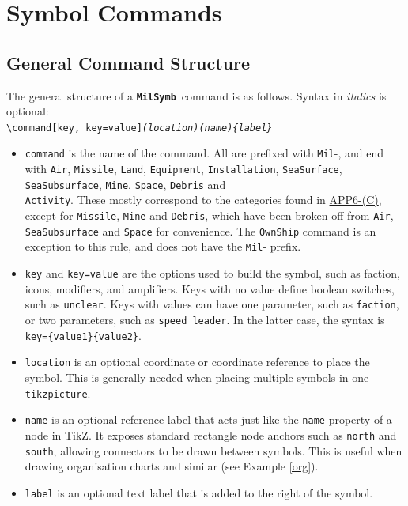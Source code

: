 \documentclass[a4paper, titlepage]{article}
\newcommand\MilSymb{\textbf{\texttt{MilSymb}}}
\newcommand\DocLink{\href{https://www.awl.edu.pl/images/en/APP_6_C.pdf}{APP6-(C)}}
\begin{document}
\section{Symbol Commands}

\subsection{General Command Structure}

The general structure of a \MilSymb\  command is as follows. Syntax in \textit{italics} is optional:\\

\texttt{\textbackslash command[key, key=value]\textit{(location)(name)\{label\}}}

\begin{itemize}
\item \texttt{command} is the name of the command. All are prefixed with \texttt{Mil}-, and end with \texttt{Air}, \texttt{Missile}, \texttt{Land}, \texttt{Equipment}, \texttt{Installation}, \texttt{SeaSurface}, \texttt{SeaSubsurface}, \texttt{Mine}, \texttt{Space}, \texttt{Debris} and\\ \texttt{Activity}. These mostly correspond to the categories found in \DocLink, except for \texttt{Missile}, \texttt{Mine} and \texttt{Debris}, which have been broken off from \texttt{Air}, \texttt{SeaSubsurface} and \texttt{Space} for convenience. The \texttt{OwnShip} command is an exception to this rule, and does not have the \texttt{Mil}- prefix.

\item \texttt{key} and \texttt{key=value} are the options used to build the symbol, such as faction, icons, modifiers, and amplifiers. Keys with no value define boolean switches, such as \texttt{unclear}. Keys with values can have one parameter, such as \texttt{faction}, or two parameters, such as \texttt{speed leader}. In the latter case, the syntax is \texttt{key=\{value1\}\{value2\}}.
\item \texttt{location} is an optional coordinate or coordinate reference to place the symbol. This is generally needed when placing multiple symbols in one \texttt{tikzpicture}.
\item \texttt{name} is an optional reference label that acts just like the \texttt{name} property of a node in TikZ. It exposes standard rectangle node anchors such as \texttt{north} and \texttt{south}, allowing connectors to be drawn between symbols. This is useful when drawing organisation charts and similar (see Example \ref{org}).
\item \texttt{label} is an optional text label that is added to the right of the symbol.
\end{itemize}
\end{document}
